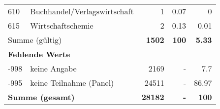 \begin{longtable}{lXrrr}
        610 & \multicolumn{1}{X}{Buchhandel/Verlagswirtschaft} & %
          \num{1} &
          \num[round-mode=places,round-precision=2]{0,07} &
          \num[round-mode=places,round-precision=2]{0} \\

        615 & \multicolumn{1}{X}{Wirtschaftschemie} & %
          \num{2} &
          \num[round-mode=places,round-precision=2]{0,13} &
          \num[round-mode=places,round-precision=2]{0,01} \\

     \midrule
     \multicolumn{2}{l}{Summe (gültig)} &
       \textbf{\num{1502}} &
     \textbf{100} &
       \textbf{\num[round-mode=places,round-precision=2]{5,33}} \\
     \multicolumn{5}{l}{\textbf{Fehlende Werte}}\\
       -998 &
       keine Angabe &
         \num{2169} &
        - &
         \num[round-mode=places,round-precision=2]{7,7} \\
       -995 &
       keine Teilnahme (Panel) &
         \num{24511} &
        - &
         \num[round-mode=places,round-precision=2]{86,97} \\
     \midrule
     \multicolumn{2}{l}{\textbf{Summe (gesamt)}} &
          \textbf{\num{28182}} &
        \textbf{-} &
        \textbf{100} \\
     \bottomrule
     \end{longtable}
     
